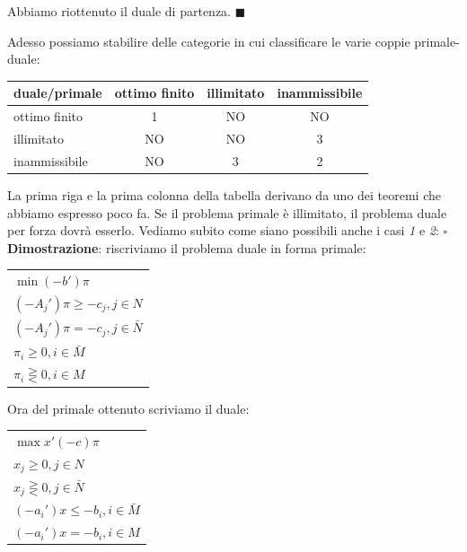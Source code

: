 \documentclass[11pt]{book}
\begin{document}
Abbiamo riottenuto il duale di partenza. $\blacksquare$
\vspace{11pt}

Adesso possiamo stabilire delle categorie in cui classificare le varie
coppie primale-duale:

\vspace{11pt}
\begin{center}
\begin{tabular}{|l|c|c|c|}
duale/primale & ottimo finito & illimitato & inammissibile \\ \hline
ottimo finito & 1 & NO & NO \\ \hline
illimitato & NO & NO & 3 \\ \hline
inammissibile & NO & 3 & 2 \\ \hline
\end{tabular}
\end{center}
\vspace{11pt}

La prima riga e la prima colonna della tabella derivano da uno dei
teoremi che abbiamo espresso poco fa.  Se il problema primale \`e
illimitato, il problema duale per forza dovr\`a esserlo.  Vediamo
subito come siano possibili anche i casi {\em 1} e {\em
  2}:\vspace{11pt} $\square${\bf Dimostrazione}: riscriviamo il
problema duale in forma primale:

\vspace{11pt}
\begin{center}
\begin{tabular}{l}
$\min (-b')\pi$\\
$(-A_j')\pi \geq -c_j, j \in N$\\
$(-A_j')\pi = -c_j, j \in \bar{N}$\\
$\pi_i \geq 0, i \in \bar{M}$\\
$\pi_i \gtreqless 0, i \in M$\\
\end{tabular}
\end{center}
\vspace{11pt}

Ora del primale ottenuto scriviamo il duale:

\vspace{11pt}
\begin{center}
\begin{tabular}{l}
$\max x'(-c)\pi$\\
$x_j \geq 0, j \in N$\\
$x_j \gtreqless 0, j \in \bar{N}$\\
$(-a_i')x \leq -b_i, i \in \bar{M}$\\
$(-a_i')x = -b_i, i \in M$\\
\end{tabular}
\end{center}
\vspace{11pt}
\end{document}
